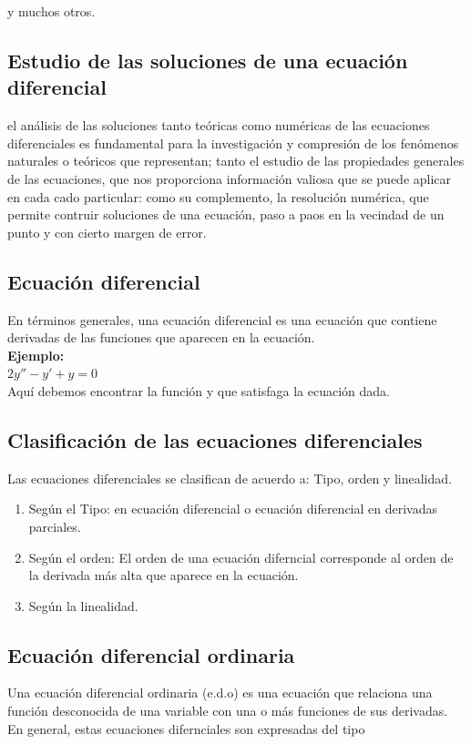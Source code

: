 \documentclass{book}
\begin{document}
    y muchos otros.
    \subsection{Estudio de las soluciones de una ecuación diferencial}

    el análisis de las soluciones tanto teóricas como numéricas de las ecuaciones
    diferenciales es fundamental para la investigación y compresión de los fenómenos naturales
    o teóricos que representan; tanto el estudio de las propiedades generales de las ecuaciones, que nos 
    proporciona información valiosa que se puede aplicar en cada cado particular: como su complemento, la resolución numérica,
    que permite contruir soluciones de una ecuación, paso a paos en la vecindad de un punto y con cierto margen de error.
    
    \subsection{Ecuación diferencial}
    En términos generales, una ecuación diferencial es una ecuación que 
    contiene derivadas de las funciones que aparecen en la ecuación.
    \\
    \textbf{Ejemplo:}
    \\
    $2y''-y'+y=0$
    \\ 
    Aquí debemos encontrar la función y que satisfaga la ecuación dada.
    
    \subsection{Clasificación de las ecuaciones diferenciales}
    Las ecuaciones diferenciales se clasifican de acuerdo a:
    Tipo, orden y linealidad.
    
    \begin{enumerate}
        \item Según el Tipo: en ecuación diferencial o ecuación diferencial en derivadas parciales.
        \item Según el orden: El orden de una ecuación diferncial corresponde al orden de la derivada más alta que aparece en la ecuación.
        \item Según la linealidad.
    \end{enumerate}

    \subsection{Ecuación diferencial ordinaria}
    Una ecuación diferencial ordinaria (e.d.o) es una ecuación que relaciona 
    una función desconocida de una variable con una o más funciones de sus derivadas.
    En general, estas ecuaciones difernciales son expresadas del tipo
\end{document}
